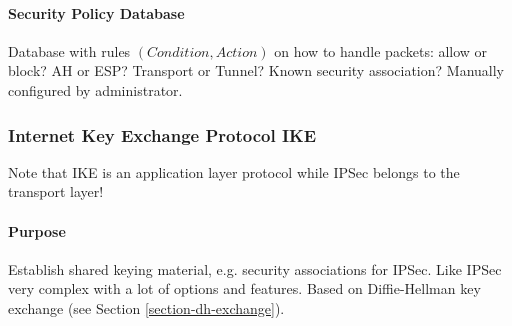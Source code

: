 \paragraph{Security Policy Database} Database with rules $(Condition, Action)$ on how to handle packets: allow or block? AH or ESP? Transport or Tunnel? Known security association? Manually configured by administrator.



\subsubsection{Internet Key Exchange Protocol IKE}\label{section-ike}

Note that IKE is an application layer protocol while IPSec belongs to the transport layer!

\paragraph{Purpose} Establish shared keying material, e.g. security associations for IPSec. Like IPSec very complex with a lot of options and features. Based on Diffie-Hellman key exchange (see Section \ref{section-dh-exchange}).

